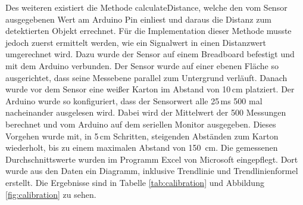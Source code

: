         Des weiteren existiert die Methode calculateDistance, welche den vom Sensor ausgegebenen Wert am Arduino Pin einliest und daraus die Distanz zum detektierten Objekt errechnet. Für die Implementation dieser Methode musste jedoch zuerst ermittelt werden, wie ein Signalwert in einen Distanzwert umgerechnet wird. Dazu wurde der Sensor auf einem Breadboard befestigt und mit dem Arduino verbunden. Der Sensor wurde auf einer ebenen Fläche so ausgerichtet, dass seine Messebene parallel zum Untergrund verläuft. Danach wurde vor dem Sensor eine weißer Karton im Abstand von 10\,cm platziert. Der Arduino wurde so konfiguriert, dass der Sensorwert alle 25\,ms 500 mal nacheinander ausgelesen wird. Dabei wird der Mittelwert der 500 Messungen berechnet und vom Arduino auf dem seriellen Monitor ausgegeben. Dieses Vorgehen wurde mit, in 5\,cm Schritten, steigenden Abständen zum Karton wiederholt, bis zu einem maximalen Abstand von 150\, cm. Die gemessenen Durchschnittswerte wurden im Programm Excel von Microsoft eingepflegt. Dort wurde aus den Daten ein Diagramm, inklusive Trendlinie und Trendlinienformel erstellt. Die Ergebnisse sind in Tabelle \ref{tab:calibration} und Abbildung \ref{fig:calibration} zu sehen.

